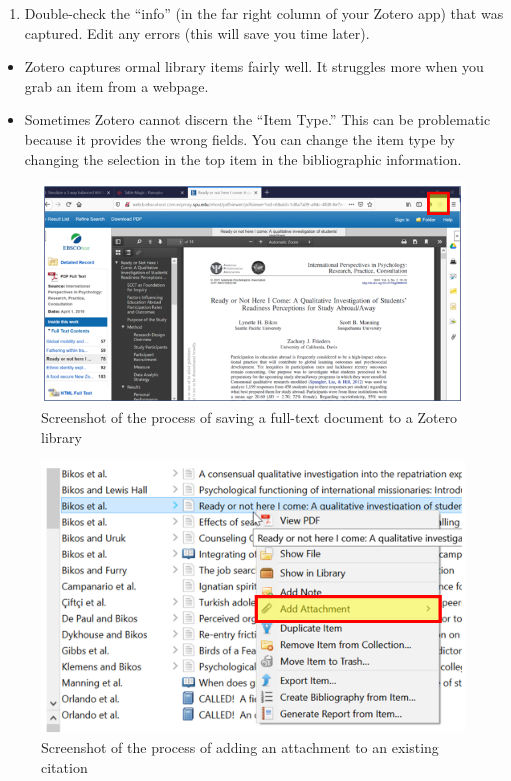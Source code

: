 \documentclass[
  english,
]{book}
\providecommand{\tightlist}{%
  \setlength{\itemsep}{0pt}\setlength{\parskip}{0pt}}
\begin{document}
\begin{enumerate}
\def\labelenumi{\arabic{enumi}.}
\setcounter{enumi}{4}
\tightlist
\item
  Double-check the ``info'' (in the far right column of your Zotero app) that was captured. Edit any errors (this will save you time later).
\end{enumerate}

\begin{itemize}
\tightlist
\item
  Zotero captures ormal library items fairly well. It struggles more when you grab an item from a webpage.
\item
  Sometimes Zotero cannot discern the ``Item Type.'' This can be problematic because it provides the wrong fields. You can change the item type by changing the selection in the top item in the bibliographic information.
\end{itemize}

\begin{figure}
\centering
\includegraphics{images/Zotero/SavingFullText.png}
\caption{Screenshot of the process of saving a full-text document to a Zotero library}
\end{figure}

\begin{figure}
\centering
\includegraphics{images/Zotero/AddingAttachment.png}
\caption{Screenshot of the process of adding an attachment to an existing citation}
\end{figure}
\end{document}
